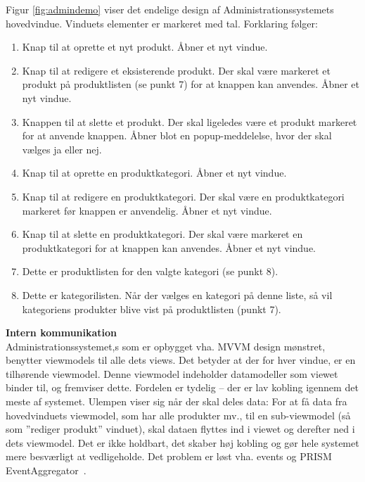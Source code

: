 Figur \ref{fig:admindemo} viser det endelige design af Administrationssystemets hovedvindue. Vinduets elementer er markeret med tal. Forklaring følger:
\begin{enumerate}
	\item Knap til at oprette et nyt produkt. Åbner et nyt vindue.
	\item Knap til at redigere et eksisterende produkt. Der skal være markeret et produkt på produktlisten (se punkt 7) for at knappen kan anvendes. Åbner et nyt vindue.
	\item Knappen til at slette et produkt. Der skal ligeledes være et produkt markeret for at anvende knappen. Åbner blot en popup-meddelelse, hvor der skal vælges ja eller nej.
	\item Knap til at oprette en produktkategori. Åbner et nyt vindue.
	\item Knap til at redigere en produktkategori. Der skal være en produktkategori markeret før knappen er anvendelig. Åbner et nyt vindue.
	\item Knap til at slette en produktkategori. Der skal være markeret en produktkategori for at knappen kan anvendes. Åbner et nyt vindue.
	\item Dette er produktlisten for den valgte kategori (se punkt 8).
	\item Dette er kategorilisten. Når der vælges en kategori på denne liste, så vil kategoriens produkter blive vist på produktlisten (punkt 7).
\end{enumerate}

\textbf{Intern kommunikation}\\
Administrationssystemet,s som er opbygget vha. MVVM design mønstret, benytter viewmodels til alle dets views. Det betyder at der for hver vindue, er en tilhørende viewmodel. Denne viewmodel indeholder datamodeller som viewet binder til, og fremviser dette. Fordelen er tydelig – der er lav kobling igennem det meste af systemet. Ulempen viser sig når der skal deles data: For at få data fra hovedvinduets viewmodel, som har alle produkter mv., til en sub-viewmodel (så som ”rediger produkt” vinduet), skal dataen flyttes ind i viewet og derefter ned i dets viewmodel. Det er ikke holdbart, det skaber høj kobling og gør hele systemet mere besværligt at vedligeholde.
Det problem er løst vha. events og PRISM EventAggregator~\cite{PRISM}.

